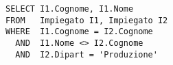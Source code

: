 \begin{lstlisting}
SELECT I1.Cognome, I1.Nome
FROM   Impiegato I1, Impiegato I2
WHERE  I1.Cognome = I2.Cognome
  AND  I1.Nome <> I2.Cognome
  AND  I2.Dipart = 'Produzione'
\end{lstlisting}
